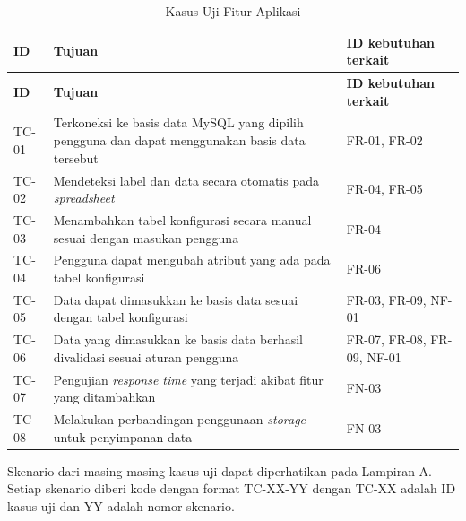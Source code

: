 	\begin{small}
	\begin{longtable}{ | p{2cm} | p{8cm} | p{3cm} | }
	    \caption{Kasus Uji Fitur Aplikasi}
	    \label{KasusUjiFA}\\ \hline
	    \centering\bfseries{ID} & \centering\bfseries{Tujuan} & \centering\bfseries{ID kebutuhan terkait} \tabularnewline \hline
	    \endfirsthead
	    \hline
	    \centering\bfseries{ID} & \centering\bfseries{Tujuan} & \centering\bfseries{ID kebutuhan terkait} \tabularnewline \hline
	    \endhead
		TC-01 & Terkoneksi ke basis data MySQL yang dipilih pengguna dan dapat menggunakan basis data tersebut& FR-01, FR-02 \\ \hline
		TC-02 & Mendeteksi label dan data secara otomatis pada \textit{spreadsheet} & FR-04, FR-05 \\ \hline
		TC-03 & Menambahkan tabel konfigurasi secara manual sesuai dengan masukan pengguna & FR-04 \\ \hline
		TC-04 & Pengguna dapat mengubah atribut yang ada pada tabel konfigurasi & FR-06 \\ \hline
		TC-05 & Data dapat dimasukkan ke basis data sesuai dengan tabel konfigurasi & FR-03, FR-09, NF-01 \\ \hline
		TC-06 & Data yang dimasukkan ke basis data berhasil divalidasi sesuai aturan pengguna & FR-07, FR-08, FR-09, NF-01 \\ \hline	
		TC-07 & Pengujian \textit{response time} yang terjadi akibat fitur yang ditambahkan & FN-03 \\ \hline
		TC-08 & Melakukan perbandingan penggunaan \textit{storage} untuk penyimpanan data & FN-03 \\ \hline
	\end{longtable}
	\end{small}

	Skenario dari masing-masing kasus uji dapat diperhatikan pada Lampiran A. Setiap skenario diberi kode dengan format TC-XX-YY dengan TC-XX adalah ID kasus uji dan YY adalah nomor skenario.

